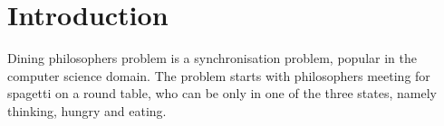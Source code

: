 \section{Introduction}

Dining philosophers problem is a synchronisation problem, popular in the computer science domain. The problem starts with philosophers meeting for spagetti on a round table, who can be only in one of the three states, namely thinking, hungry and eating. 
